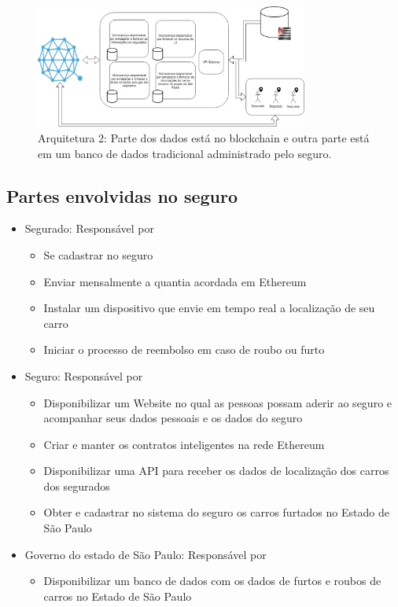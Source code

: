 \begin{figure}[ht]
\centering
\includegraphics[width=0.8\textwidth]{Cap1/arquitetura_2}
\caption{Arquitetura 2: Parte dos dados está no blockchain e outra parte está em um banco de dados tradicional administrado pelo seguro.}
\label{arquitetura_2}
\end{figure}

\subsection{Partes envolvidas no seguro}

\begin{itemize}
\item Segurado: Responsável por
	\begin{itemize}
	\item Se cadastrar no seguro
    \item Enviar mensalmente a quantia acordada em Ethereum
    \item Instalar um dispositivo que envie em tempo real a localização de seu carro
    \item Iniciar o processo de reembolso em caso de roubo ou furto
	\end{itemize}
\item Seguro: Responsável por
	\begin{itemize}
	\item Disponibilizar um Website no qual as pessoas possam aderir ao seguro e acompanhar seus dados pessoais e os dados do seguro
    \item Criar e manter os contratos inteligentes na rede Ethereum
    \item Disponibilizar uma API para receber os dados de localização dos carros dos segurados
    \item Obter e cadastrar no sistema do seguro os carros furtados no Estado de São Paulo
	\end{itemize}
\item Governo do estado de São Paulo: Responsável por
	\begin{itemize}
	\item Disponibilizar um banco de dados com os dados de furtos e roubos de carros no Estado de São Paulo
	\end{itemize}
\end{itemize}

